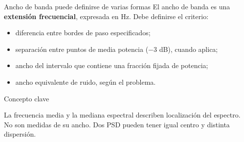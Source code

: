 \documentclass[
  10pt,
  ignorenonframetext,
  aspectratio=169,
  spanish,
]{beamer}
\providecommand{\tightlist}{%
  \setlength{\itemsep}{0pt}\setlength{\parskip}{0pt}}
\begin{document}
\begin{frame}{Ancho de banda puede definirse de varias formas}
\label{d2-108}
El ancho de banda es una \textbf{extensión frecuencial}, expresada en
Hz. Debe definirse el criterio:

\begin{itemize}
\tightlist
\item
  diferencia entre bordes de paso especificados;
\item
  separación entre puntos de media potencia (\(-3\) dB), cuando aplica;
\item
  ancho del intervalo que contiene una fracción fijada de potencia;
\item
  ancho equivalente de ruido, según el problema.
\end{itemize}

\begin{block}{Concepto clave}

La frecuencia media y la mediana espectral describen localización del
espectro. No son medidas de su ancho. Dos PSD pueden tener igual centro
y distinta dispersión.

\end{block}

\end{frame}
\end{document}
